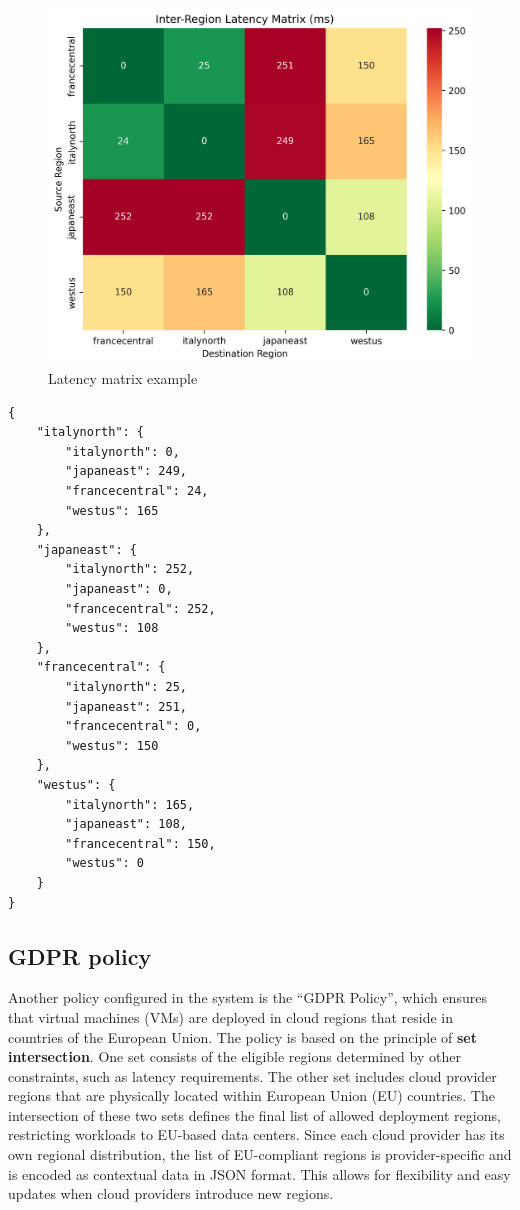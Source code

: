 \begin{figure}[H]
  \centering
  \includegraphics[width=0.75\linewidth]{images/latency_heatmap.png}
  \caption{Latency matrix example}
  \label{fig:latency_matrix}
\end{figure}


\lstset{style=jsonstyle}
\begin{lstlisting}[caption={Latancy matrix example encoded in JSON format}, label={lst:latency_matrix_example}]
  {
    "italynorth": {
        "italynorth": 0,
        "japaneast": 249,
        "francecentral": 24,
        "westus": 165
    },
    "japaneast": {
        "italynorth": 252,
        "japaneast": 0,
        "francecentral": 252,
        "westus": 108
    },
    "francecentral": {
        "italynorth": 25,
        "japaneast": 251,
        "francecentral": 0,
        "westus": 150
    },
    "westus": {
        "italynorth": 165,
        "japaneast": 108,
        "francecentral": 150,
        "westus": 0
    }
}

\end{lstlisting}

\subsection{GDPR policy}

Another policy configured in the system is the ``GDPR Policy'', which ensures that virtual machines (VMs) are deployed in cloud regions that reside in countries of the European Union. 
The policy is based on the principle of \textbf{set intersection}. One set consists of the eligible regions determined by other constraints, such as latency requirements. The other set includes cloud provider regions that are physically located within European Union (EU) countries.
The intersection of these two sets defines the final list of allowed deployment regions, restricting workloads to EU-based data centers.
Since each cloud provider has its own regional distribution, the list of EU-compliant regions is provider-specific and is encoded as contextual data in JSON format. This allows for flexibility and easy updates when cloud providers introduce new regions.

